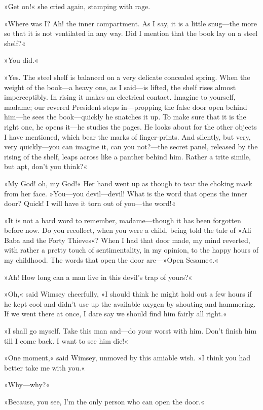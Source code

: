 »Get on!« she cried again, stamping with rage.

»Where was I\@? Ah! the inner compartment. As I say, it is a little snug—the more so that it is not ventilated in any way. Did I mention that the book lay on a steel shelf?«

»You did.«

»Yes. The steel shelf is balanced on a very delicate concealed spring. When the weight of the book—a heavy one, as I said—is lifted, the shelf rises almost imperceptibly. In rising it makes an electrical contact. Imagine to yourself, madame; our revered President steps in—propping the false door open behind him—he sees the book—quickly he snatches it up. To make sure that it is the right one, he opens it—he studies the pages. He looks about for the other objects I have mentioned, which bear the marks of finger-prints. And silently, but very, very quickly—you can imagine it, can you not?—the secret panel, released by the rising of the shelf, leaps across like a panther behind him. Rather a trite simile, but apt, don't you think?«

»My God! oh, my God!« Her hand went up as though to tear the choking mask from her face. »You—you devil—devil! What is the word that opens the inner door? Quick! I will have it torn out of you—the word!«

»It is not a hard word to remember, madame—though it has been forgotten before now. Do you recollect, when you were a child, being told the tale of »Ali Baba and the Forty Thieves«? When I had that door made, my mind reverted, with rather a pretty touch of sentimentality, in my opinion, to the happy hours of my childhood. The words that open the door are—»Open Sesame«.«

»Ah! How long can a man live in this devil's trap of yours?«

»Oh,« said Wimsey cheerfully, »I should think he might hold out a few hours if he kept cool and didn't use up the available oxygen by shouting and hammering. If we went there at once, I dare say we should find him fairly all right.«

»I shall go myself. Take this man and—do your worst with him. Don't finish him till I come back. I want to see him die!«

»One moment,« said Wimsey, unmoved by this amiable wish. »I think you had better take me with you.«

»Why—why?«

»Because, you see, I'm the only person who can open the door.«

